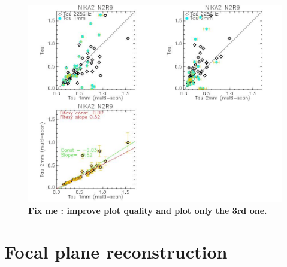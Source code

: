 \documentclass[a4paper, 11pt]{article} %
\begin{document}
\begin{figure}
\begin{center}
\includegraphics[clip, angle=0, scale = 0.5]{Figures/test_allskd_N2R9.jpg}
\caption{{\bf Fix me : improve plot quality and plot only the 3rd one.}}
\label{fig:test_allskd_N2R9}
\end{center}
\end{figure}


\section{Focal plane reconstruction}
\label{se:fov}
\end{document}

